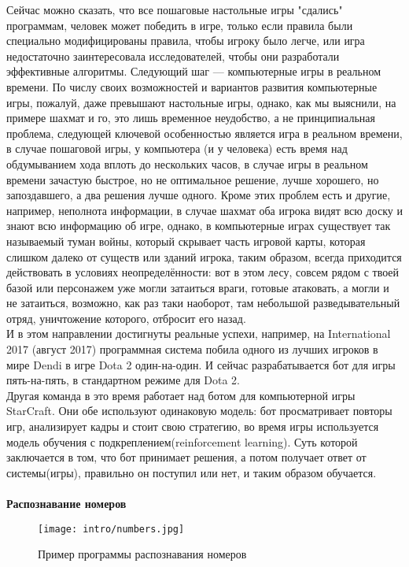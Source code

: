 Сейчас можно сказать, что все пошаговые настольные игры "сдались" программам, человек может победить в игре, только если правила были специально модифицированы правила, чтобы игроку было легче, или игра недостаточно заинтересовала исследователей, чтобы они разработали эффективные алгоритмы. Следующий шаг --- компьютерные игры в реальном времени. По числу своих возможностей и вариантов развития компьютерные игры, пожалуй, даже превышают настольные игры, однако, как мы выяснили, на примере шахмат и го, это лишь временное неудобство, а не принципиальная проблема, следующей ключевой особенностью является игра в реальном времени, в случае пошаговой игры, у компьютера (и у человека) есть время над обдумыванием хода вплоть до нескольких часов, в случае игры в реальном времени зачастую быстрое, но не оптимальное решение, лучше хорошего, но запоздавшего, а два решения лучше одного. Кроме этих проблем есть и другие, например, неполнота информации, в случае шахмат оба игрока видят всю доску и знают всю информацию об игре, однако, в компьютерные играх существует так называемый туман войны, который скрывает часть игровой карты, которая слишком далеко от существ или зданий игрока, таким образом, всегда приходится действовать в условиях неопределённости: вот в этом лесу, совсем рядом с твоей базой или персонажем уже могли затаиться враги, готовые атаковать, а могли и не затаиться, возможно, как раз таки наоборот, там небольшой разведывательный отряд, уничтожение которого, отбросит его назад.\\

И в этом направлении достигнуты реальные успехи, например, на International 2017 (август 2017) программная система побила одного из лучших игроков в мире Dendi в игре Dota 2 один-на-один\cite{dota:ai_vs_dendi}. И сейчас разрабатывается бот для игры пять-на-пять, в стандартном режиме для Dota 2\cite{dota:ai_vs_5}.\\

Другая команда в это время работает над ботом для компьютерной игры StarCraft\cite{starcraft:bot_vs_human}\cite{starcraft:bot_vs_human2}. Они обе используют одинаковую модель: бот просматривает повторы игр, анализирует кадры и стоит свою стратегию, во время игры используется модель обучения с подкреплением(reinforcement learning). Суть которой заключается в том, что бот принимает решения, а потом получает ответ от системы(игры), правильно он поступил или нет, и таким образом обучается.\\\\

\textbf{Распознавание номеров}\\
\begin{wrapfigure}{l}{0.4\textwidth}
    \vspace{-0.5cm}
    \texttt{[image: intro/numbers.jpg]}
    \caption{Пример программы распознавания номеров}
\end{wrapfigure}






